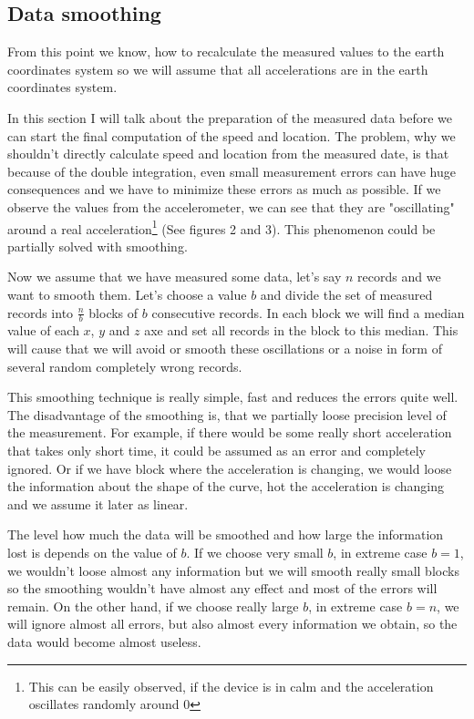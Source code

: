 \documentclass[hidelinks,a4paper]{article}
\begin{document}
\subsection{Data smoothing}
From this point we know, how to recalculate the measured values to the earth coordinates system so we will assume that all accelerations are in the earth coordinates system.\par
In this section I will talk about the preparation of the measured data before we can start the final computation of the speed and location. The problem, why we shouldn't directly calculate speed and location from the measured date, is that because of the double integration, even small measurement errors can have huge consequences and we have to minimize these errors as much as possible. If we observe the values from the accelerometer, we can see that they are "oscillating" around a real acceleration\footnote{This can be easily observed, if the device is in calm and the acceleration oscillates randomly around 0} (See figures 2 and 3). This phenomenon could be partially solved with smoothing.\par
Now we assume that we have measured some data, let's say $n$ records and we want to smooth them. Let's choose a value $b$ and divide the set of measured records into $\tfrac{n}{b}$ blocks of $b$ consecutive records. In each block we will find a median value of each $x$, $y$ and $z$ axe and set all records in the block to this median. This will cause that we will avoid or smooth these oscillations or a noise in form of several random completely wrong records.\par
This smoothing technique is really simple, fast and reduces the errors quite well. The disadvantage of the smoothing is, that we partially loose precision level of the measurement. For example, if there would be some really short acceleration that takes only short time, it could be assumed as an error and completely ignored. Or if we have block where the acceleration is changing, we would loose the information about the shape of the curve, hot the acceleration is changing and we assume it later as linear.\par
The level how much the data will be smoothed and how large the information lost is depends on the value of $b$. If we choose very small $b$, in extreme case $b = 1$, we wouldn't loose almost any information but we will smooth really small blocks so the smoothing wouldn't have almost any effect and most of the errors will remain. On the other hand, if we choose really large $b$, in extreme case $b = n$, we will ignore almost all errors, but also almost every information we obtain, so the data would become almost useless.\par
\end{document}
